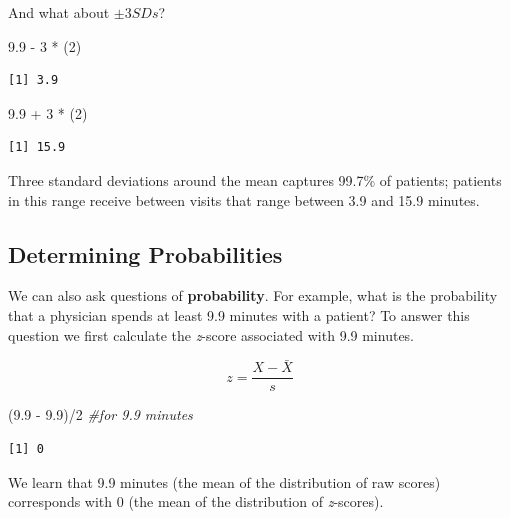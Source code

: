 \documentclass[
  11pt,
]{book}
\newenvironment{Shaded}{\begin{snugshade}}{\end{snugshade}}
\newcommand{\CommentTok}[1]{\textcolor[rgb]{0.56,0.35,0.01}{\textit{#1}}}
\newcommand{\DecValTok}[1]{\textcolor[rgb]{0.00,0.00,0.81}{#1}}
\newcommand{\FloatTok}[1]{\textcolor[rgb]{0.00,0.00,0.81}{#1}}
\newcommand{\NormalTok}[1]{#1}
\newcommand{\SpecialCharTok}[1]{\textcolor[rgb]{0.00,0.00,0.00}{#1}}
\begin{document}
And what about \(\pm 3SDs\)?

\begin{Shaded}
\begin{Highlighting}[]
\FloatTok{9.9} \SpecialCharTok{{-}} \DecValTok{3} \SpecialCharTok{*}\NormalTok{ (}\DecValTok{2}\NormalTok{)}
\end{Highlighting}
\end{Shaded}

\begin{verbatim}
[1] 3.9
\end{verbatim}

\begin{Shaded}
\begin{Highlighting}[]
\FloatTok{9.9} \SpecialCharTok{+} \DecValTok{3} \SpecialCharTok{*}\NormalTok{ (}\DecValTok{2}\NormalTok{)}
\end{Highlighting}
\end{Shaded}

\begin{verbatim}
[1] 15.9
\end{verbatim}

Three standard deviations around the mean captures 99.7\% of patients; patients in this range receive between visits that range between 3.9 and 15.9 minutes.

\hypertarget{determining-probabilities}{%
\subsection{Determining Probabilities}\label{determining-probabilities}}

We can also ask questions of \textbf{probability}. For example, what is the probability that a physician spends at least 9.9 minutes with a patient? To answer this question we first calculate the \emph{z}-score associated with 9.9 minutes.

\[z=\frac{X-\bar{X}}{s}\]

\begin{Shaded}
\begin{Highlighting}[]
\NormalTok{(}\FloatTok{9.9} \SpecialCharTok{{-}} \FloatTok{9.9}\NormalTok{)}\SpecialCharTok{/}\DecValTok{2}  \CommentTok{\#for 9.9 minutes}
\end{Highlighting}
\end{Shaded}

\begin{verbatim}
[1] 0
\end{verbatim}

We learn that 9.9 minutes (the mean of the distribution of raw scores) corresponds with 0 (the mean of the distribution of \emph{z}-scores).
\end{document}
